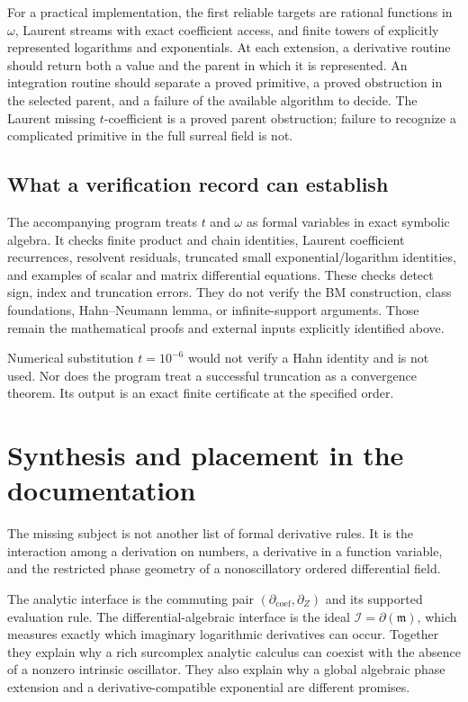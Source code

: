 \documentclass[11pt]{article}
\numberwithin{equation}{section}
\theoremstyle{definition}
\newcommand{\mm}{\mathfrak m}
\newcommand{\II}{\mathcal I}
\newcommand{\DD}{\partial}
\newcommand{\Dc}{\partial_{\mathrm{coef}}}
\newcommand{\Dz}{\partial_Z}
\begin{document}
For a practical implementation, the first reliable targets are rational
functions in $\omega$, Laurent streams with exact coefficient access,
and finite towers of explicitly represented logarithms and exponentials.
At each extension, a derivative routine should return both a value and
the parent in which it is represented. An integration routine should
separate a proved primitive, a proved obstruction in the selected parent,
and a failure of the available algorithm to decide. The Laurent missing
$t$-coefficient is a proved parent obstruction; failure to recognize a
complicated primitive in the full surreal field is not.

\subsection{What a verification record can establish}
The accompanying program treats $t$ and $\omega$ as formal variables in
exact symbolic algebra. It checks finite product and chain identities,
Laurent coefficient recurrences, resolvent residuals, truncated small
exponential/logarithm identities, and examples of scalar and matrix
differential equations. These checks detect sign, index and truncation
errors. They do not verify the BM construction, class foundations,
Hahn--Neumann lemma, or infinite-support arguments. Those remain the
mathematical proofs and external inputs explicitly identified above.

Numerical substitution $t=10^{-6}$ would not verify a Hahn identity and
is not used. Nor does the program treat a successful truncation as a
convergence theorem. Its output is an exact finite certificate at the
specified order.

\section{Synthesis and placement in the documentation}
\label{sec:synthesis}

The missing subject is not another list of formal derivative rules. It is
the interaction among a derivation on numbers, a derivative in a function
variable, and the restricted phase geometry of a nonoscillatory ordered
differential field.

The analytic interface is the commuting pair $(\Dc,\Dz)$ and its
supported evaluation rule. The differential-algebraic interface is the
ideal $\II=\DD(\mm)$, which measures exactly which imaginary
logarithmic derivatives can occur. Together they explain why a rich
surcomplex analytic calculus can coexist with the absence of a nonzero
intrinsic oscillator. They also explain why a global algebraic phase
extension and a derivative-compatible exponential are different promises.
\end{document}
